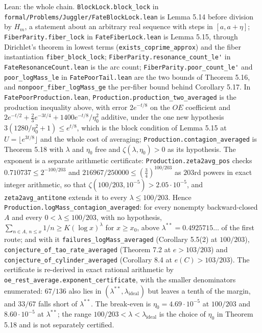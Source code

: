 \documentclass[11pt,a4paper]{article}
\begin{document}
Lean: the whole chain. \texttt{\nolinkurl{BlockLock.block_lock}} in
\texttt{\nolinkurl{formal/Problems/Juggler/FateBlockLock.lean}} is Lemma
5.14 before division by \(H_m\), a statement about an arbitrary real
sequence with steps in \([a,a+\eta]\);
\texttt{\nolinkurl{FiberParity.fiber_lock}} in
\texttt{\nolinkurl{FateFiberLock.lean}} is Lemma 5.15, through
Dirichlet's theorem in lowest terms
(\texttt{\nolinkurl{exists_coprime_approx}}) and the fiber instantiation
\texttt{\nolinkurl{fiber_block_lock}};
\texttt{\nolinkurl{FiberParity.resonance_count_le'}} in
\texttt{\nolinkurl{FateResonanceCount.lean}} is the arc count;
\texttt{\nolinkurl{FiberParity.poor_count_le'}} and
\texttt{\nolinkurl{poor_logMass_le}} in
\texttt{\nolinkurl{FatePoorTail.lean}} are the two bounds of Theorem
5.16, and \texttt{\nolinkurl{nonpoor_fiber_logMass_ge}} the per-fiber
bound behind Corollary 5.17. In
\texttt{\nolinkurl{FatePoorProduction.lean}},
\texttt{\nolinkurl{Production.production_two_averaged}} is the
production inequality above, with error \(2e^{-t/8}\) on the \(OE\)
coefficient and \(2e^{-t/2}+\tfrac23e^{-3t/4}+1400e^{-t/8}/\eta_0^2\)
additive, under the one new hypothesis
\(3(1280/\eta_0^2+1)\le e^{t/8}\), which is the block condition of Lemma
5.15 at \(U=\lfloor e^{3t/8}\rfloor\) and the whole cost of averaging;
\texttt{\nolinkurl{Production.contagion_averaged}} is Theorem 5.18 with
\(\lambda\) and \(\eta_0\) free and \(\zeta(\lambda,\eta_0)>0\) as its
hypothesis. The exponent is a separate arithmetic certificate:
\texttt{\nolinkurl{Production.zeta2avg_pos}} checks
\(0.710737\le2^{-100/203}\) and \(216967/250000\le(\tfrac34)^{100/203}\)
as \(203\)rd powers in exact integer arithmetic, so that
\(\zeta(100/203,10^{-5})>2.05\cdot10^{-5}\), and
\texttt{\nolinkurl{zeta2avg_antitone}} extends it to every
\(\lambda\le100/203\). Hence
\texttt{\nolinkurl{Production.logMass_contagion_averaged}}: for every
nonempty backward-closed \(A\) and every \(0<\lambda\le100/203\), with
no hypothesis, \(\sum_{n\in A,\,n\le x}1/n\ge K(\log x)^\lambda\) for
\(x\ge x_0\), above \(\lambda^{**}=0.4925715\ldots\) of the first route;
and with it \texttt{\nolinkurl{failures_logMass_averaged}} (Corollary
5.5(2) at \(100/203\)),
\texttt{\nolinkurl{conjecture_of_tao_rate_averaged}} (Theorem 7.2 at
\(e>103/203\)) and \texttt{\nolinkurl{conjecture_of_cylinder_averaged}}
(Corollary 8.4 at \(e(C)>103/203\)). The certificate is re-derived in
exact rational arithmetic by
\texttt{\nolinkurl{oe_rest_average.exponent_certificate}}, with the
smaller denominators enumerated: \(67/136\) also lies in
\((\lambda^{**},\lambda_{\mathrm{ideal}})\) but leaves a tenth of the
margin, and \(33/67\) falls short of \(\lambda^{**}\). The break-even is
\(\eta_0=4.69\cdot10^{-5}\) at \(100/203\) and \(8.60\cdot10^{-5}\) at
\(\lambda^{**}\); the range \(100/203<\lambda<\lambda_{\mathrm{ideal}}\)
is the choice of \(\eta_0\) in Theorem 5.18 and is not separately
certified.
\end{document}

